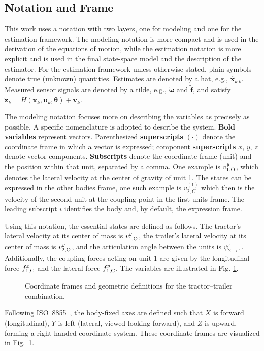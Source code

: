 \documentclass[conference]{IEEEtran}
\begin{document}
\subsection{Notation and Frame} \label{sec:notation}
This work uses a notation with two layers, one for modeling and one for the estimation framework. The modeling notation is more compact and is used in the derivation of the equations of motion, while the estimation notation is more explicit and is used in the final state-space model and the description of the estimator. 
For the estimation framework unless otherwise stated, plain symbols denote true (unknown) quantities.
Estimates are denoted by a hat, e.g., $\hat{\bm x}_{k|k}$.
Measured sensor signals are denoted by a tilde, e.g., $\tilde{\bm\omega}$ and $\tilde{\bm f}$, and satisfy $\tilde{\bm z}_k = H(\bm x_k,\bm u_k,\bm\theta) + \bm v_k$.

The modeling notation focuses more on describing the variables as precisely as possible. A specific nomenclature is adopted to describe the system. \textbf{Bold variables} represent vectors. Parenthesized \textbf{superscripts} $(\cdot)$ denote the coordinate frame in which a vector is expressed; component \textbf{superscripts} $x$, $y$, $z$ denote vector components. \textbf{Subscripts} denote the coordinate frame (unit) and the position within that unit, separated by a comma. One example is $v^y_{1,\text{O}}$, which denotes the lateral velocity at the center of gravity of unit 1. The states can be expressed in the other bodies frame, one such example is $v^{(1)}_{2,C}$ which then is the velocity of the second unit at the coupling point in the first units frame. The leading subscript $i$ identifies the body and, by default, the expression frame.

Using this notation, the essential states are defined as follows. The tractor's lateral velocity at its center of mass is $v^{y}_{1,\text{O}}$, the trailer's lateral velocity at its center of mass is $v^{y}_{2,\text{O}}$, and the articulation angle between the units is $\psi^z_{2\to1}$. Additionally, the coupling forces acting on unit 1 are given by the longitudinal force $f^{x}_{1,\text{C}}$ and the lateral force $f^{y}_{1,\text{C}}$. The variables are illustrated in Fig. \ref{fig:frames}.
\begin{figure}
    \centering
    
    \caption{Coordinate frames and geometric definitions for the tractor--trailer combination.} %
    \label{fig:frames}
\end{figure}
Following ISO~8855~\cite{1400-1700_iso_nodate}, the body-fixed axes are defined such that $X$ is forward (longitudinal), $Y$ is left (lateral, viewed looking forward), and $Z$ is upward, forming a right-handed coordinate system. These coordinate frames are visualized in Fig.~\ref{fig:frames}.
\end{document}
